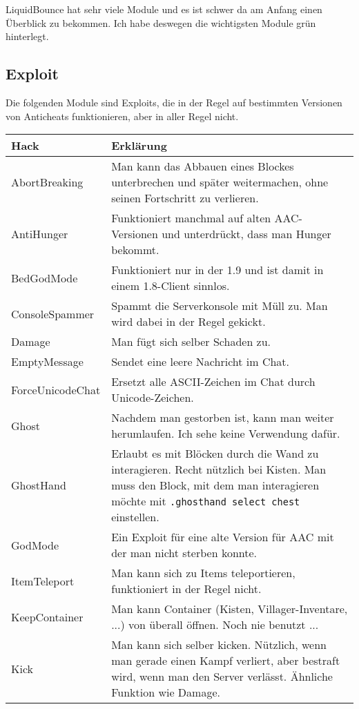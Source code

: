 LiquidBounce hat sehr viele Module und es ist schwer da am Anfang einen Überblick zu bekommen. Ich habe deswegen die wichtigsten Module \textcolor{lime!50}{grün} hinterlegt.

\subsection{Exploit}

Die folgenden Module sind Exploits, die in der Regel auf bestimmten Versionen von Anticheats funktionieren, aber in aller Regel nicht.
\begin{longtable}{p{3cm}|p{10cm}}
\textbf{Hack} & \textbf{Erklärung} \\
\hline
AbortBreaking & Man kann das Abbauen eines Blockes unterbrechen und später weitermachen, ohne seinen Fortschritt zu verlieren. \\
\hline
AntiHunger & Funktioniert manchmal auf alten AAC-Versionen und unterdrückt, dass man Hunger bekommt. \\
\hline
BedGodMode & Funktioniert nur in der 1.9 und ist damit in einem 1.8-Client sinnlos. \\
\hline
ConsoleSpammer & Spammt die Serverkonsole mit Müll zu. Man wird dabei in der Regel gekickt. \\
\hline
Damage & Man fügt sich selber Schaden zu. \\
\hline
EmptyMessage & Sendet eine leere Nachricht im Chat. \\
\hline
ForceUnicodeChat & Ersetzt alle ASCII-Zeichen im Chat durch Unicode-Zeichen. \\
\hline
Ghost & Nachdem man gestorben ist, kann man weiter herumlaufen. Ich sehe keine Verwendung dafür. \\
\hline
GhostHand & Erlaubt es mit Blöcken durch die Wand zu interagieren. Recht nützlich bei Kisten. Man muss den Block, mit dem man interagieren möchte mit \texttt{.ghosthand select chest} einstellen. \\
\hline
GodMode & Ein Exploit für eine alte Version für AAC mit der man nicht sterben konnte. \\
\hline
ItemTeleport & Man kann sich zu Items teleportieren, funktioniert in der Regel nicht. \\
\hline
KeepContainer & Man kann Container (Kisten, Villager-Inventare, ...) von überall öffnen. Noch nie benutzt ... \\
\hline
Kick & Man kann sich selber kicken. Nützlich, wenn man gerade einen Kampf verliert, aber bestraft wird, wenn man den Server verlässt. Ähnliche Funktion wie Damage. \\

\end{longtable}
